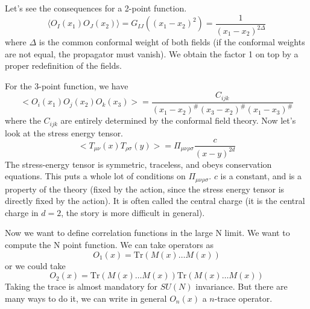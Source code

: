 \documentclass[a4paper]{book}
\theoremstyle{definition}
\theoremstyle{remark}
\begin{document}
Let's see the consequences for a 2-point function. 
\begin{equation}
    \langle O_I(x_1)O_J(x_2) \rangle = G_{IJ}((x_1 - x_2)^2) = \frac{1}{(x_1 - x_2)^{2\Delta}}
\end{equation}
where $\Delta$ is the common conformal weight of both fields (if the conformal weights are not equal, the propagator must vanish). We obtain the factor 1 on top by a proper redefinition of the fields. \par \medskip 

For the 3-point function, we have 
\begin{equation}
    <O_i(x_1)O_j(x_2)O_k(x_3)> = \frac{C_{ijk}}{(x_1 - x_2)^{\#}(x_3 - x_2)^{\#}(x_1 - x_3)^{\#}}
\end{equation}
where the $C_{ijk}$ are entirely determined by the conformal field theory. Now let's look at the stress energy tensor. 
\begin{equation}
    <T_{\mu\nu}(x)T_{\rho\sigma}(y)> = \Pi _{\mu\nu\rho\sigma}\frac{c}{(x-y)^{2d}}
\end{equation}
The stress-energy tensor is symmetric, traceless, and obeys conservation equations. This puts a whole lot of conditions on $\Pi _{\mu\nu\rho\sigma}$. $c$ is a constant, and is a property of the theory (fixed by the action, since the stress energy tensor is directly fixed by the action). It is often called the central charge (it is the central charge in $d=2$, the story is more difficult in general). \par \medskip 

Now we want to define correlation functions in the large N limit. We want to compute the N point function. We can take operators as 
\begin{equation}
    O_1(x) = \text{Tr}(M(x)\dots M(x))
\end{equation}
or we could take 
\begin{equation}
    O_2(x) = \text{Tr}(M(x)\dots M(x))\text{Tr}(M(x)\dots M(x))
\end{equation}
Taking the trace is almost mandatory for $SU(N)$ invariance. But there are many ways to do it, we can write in general $O_n(x)$ a $n$-trace operator.\par \medskip 
\end{document}

